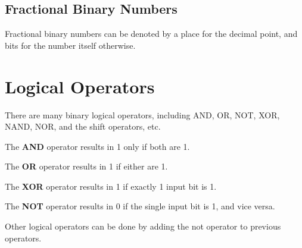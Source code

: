 \subsection{Fractional Binary Numbers}

Fractional binary numbers can be denoted by a place for the decimal point, and bits for the number itself otherwise.

\section{Logical Operators}

There are many binary logical operators, including AND, OR, NOT, XOR, NAND, NOR, and the shift operators, etc.

\begin{definition}
	The \textbf{AND} operator results in 1 only if both are 1.
\end{definition}

\begin{definition}
	The \textbf{OR} operator results in 1 if either are 1.
\end{definition}

\begin{definition}
	The \textbf{XOR} operator results in 1 if exactly 1 input bit is 1.
\end{definition}

\begin{definition}
	The \textbf{NOT} operator results in 0 if the single input bit is 1, and vice versa.
\end{definition}

Other logical operators can be done by adding the not operator to previous operators.
